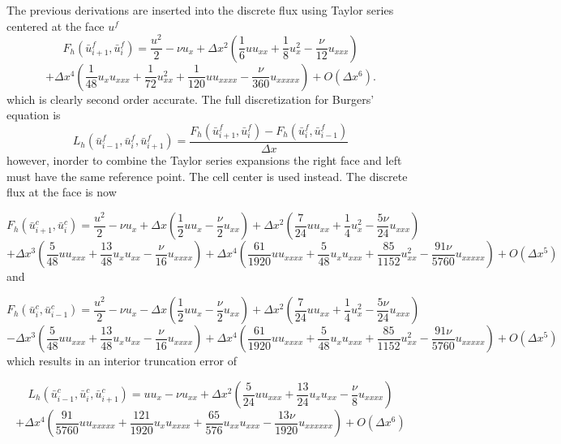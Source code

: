 \documentclass[10pt]{article}%
\begin{document}
The previous derivations are inserted into the discrete flux using Taylor series centered at the face $u^f$
\[
  F_h(\bar u^f_{i+1}, \bar u^f_{i}) = \frac{u^2}{2} - \nu u_x
    + \Delta x^2\left( \frac{1}{6}u u_{xx} + \frac{1}{8}u_x^2 - \frac{\nu}{12}u_{xxx} \right)
\]
\[
    + \Delta x^4\left( \frac{1}{48}u_x u_{xxx} + \frac{1}{72}u_{xx}^2+\frac{1}{120}u u_{xxxx} - \frac{\nu}{360}u_{xxxxx} \right)
    + O(\Delta x^6).
\]
which is clearly second order accurate. The full discretization for Burgers' equation is 
\[
  L_h(\bar u^f_{i-1},\bar u^f_{i},\bar u^f_{i+1}) = \frac{F_h(\bar u^f_{i+1}, \bar u^f_{i}) - F_h(\bar u^f_{i}, \bar u^f_{i-1})}{\Delta x}
\]
however, inorder to combine the Taylor series expansions the right face and left must have the same reference point. The cell center is used instead. The discrete flux at the face is now

\[
  F_h(\bar u^c_{i+1}, \bar u^c_{i}) = \frac{u^2}{2} -\nu u_x
                                    + \Delta x \left( \frac{1}{2}u u_x - \frac{\nu}{2} u_{xx} \right)
                                    + \Delta x^2\left( \frac{7}{24}u u_{xx} + \frac{1}{4}u_x^2 - \frac{5\nu}{24} u_{xxx} \right)
\]
\[
                                    + \Delta x^3\left( \frac{5}{48}u u_{xxx} + \frac{13}{48}u_x u_{xx} - \frac{\nu}{16} u_{xxxx} \right)
                                    + \Delta x^4\left( \frac{61}{1920}u u_{xxxx} + \frac{5}{48}u_x u_{xxx} + \frac{85}{1152}u_{xx}^2 - \frac{91\nu}{5760} u_{xxxxx} \right) 
                                    + O(\Delta x^5)
\]
and

\[
  F_h(\bar u^c_{i}, \bar u^c_{i-1}) = \frac{u^2}{2} -\nu u_x
                                    - \Delta x \left( \frac{1}{2}u u_x - \frac{\nu}{2} u_{xx} \right)
                                    + \Delta x^2\left( \frac{7}{24}u u_{xx} + \frac{1}{4}u_x^2 - \frac{5\nu}{24} u_{xxx} \right)
\]
\[
                                    - \Delta x^3\left( \frac{5}{48}u u_{xxx} + \frac{13}{48}u_x u_{xx} - \frac{\nu}{16} u_{xxxx} \right)
                                    + \Delta x^4\left( \frac{61}{1920}u u_{xxxx} + \frac{5}{48}u_x u_{xxx} + \frac{85}{1152}u_{xx}^2 - \frac{91\nu}{5760} u_{xxxxx} \right)
                                    + O(\Delta x^5)
\]
which results in an interior truncation error of

\[
  L_h(\bar u^c_{i-1},\bar u^c_{i},\bar u^c_{i+1}) = u u_x - \nu u_{xx}
                                    + \Delta x^2\left( \frac{5}{24}u u_{xxx} + \frac{13}{24}u_x u_{xx} - \frac{\nu}{8} u_{xxxx} \right)
\]
\[
                                    + \Delta x^4\left( \frac{91}{5760}u u_{xxxxx} + \frac{121}{1920} u_x u_{xxxx} + \frac{65}{576}u_{xx}u_{xxx} - \frac{13\nu}{1920} u_{xxxxxx} \right)
                                    + O(\Delta x^6)
\]
\end{document}
